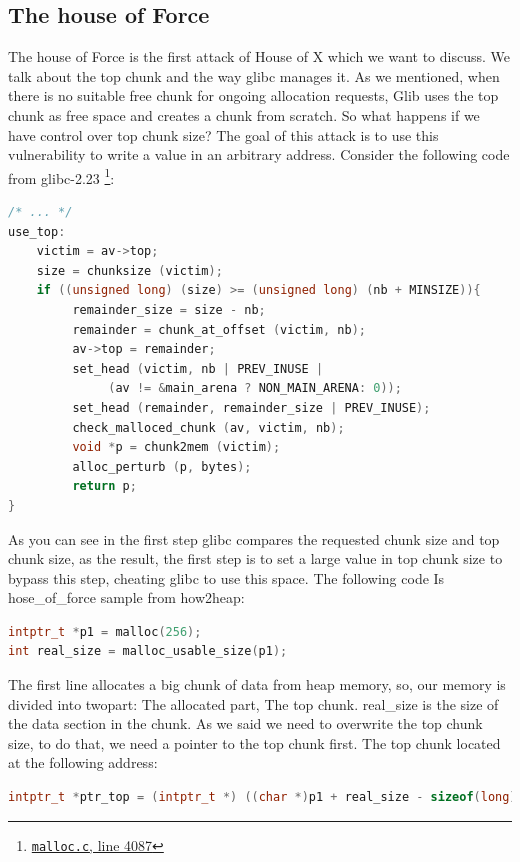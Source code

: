 \documentclass{masterthesis}
\newcommand*\libc{glibc}
\begin{document}
\subsection{The house of Force}
The house of Force is the first attack of House of X which we want to discuss. We talk about the top chunk and the way \libc{} manages it. As we mentioned, when there is no suitable free chunk for ongoing allocation requests, Glib uses the top chunk as free space and creates a chunk from scratch. So what happens if we have control over top chunk size? The goal of this attack is to use this vulnerability to write a value in an arbitrary address. Consider the following code from \libc{-2.23}  \footnote{\href{https://sourceware.org/git/?p=glibc.git;a=blob;f=malloc/malloc.c;h=f7cd29bc2f93e1082ee77800bd64a4b2a2897055;hb=9ea3686266dca3f004ba874745a4087a89682617\#l4087}{\texttt{malloc.c}, line 4087}}:
\begin{lstlisting}[language=c,frame=tlrb]
 /* ... */ 
use_top:
	victim = av->top;
	size = chunksize (victim);
	if ((unsigned long) (size) >= (unsigned long) (nb + MINSIZE)){
	     remainder_size = size - nb;
	     remainder = chunk_at_offset (victim, nb);
	     av->top = remainder;
	     set_head (victim, nb | PREV_INUSE |
	          (av != &main_arena ? NON_MAIN_ARENA: 0));
	     set_head (remainder, remainder_size | PREV_INUSE);
	     check_malloced_chunk (av, victim, nb);
	     void *p = chunk2mem (victim);
	     alloc_perturb (p, bytes);
	     return p;
}
\end{lstlisting}
As you can see in the first step \libc{} compares the requested chunk size and top chunk size, as the result, the first step is to set a large value in top chunk size to bypass this step, cheating \libc{} to use this space. The following code Is hose\_of\_force sample from how2heap:

\begin{lstlisting}[language=c,frame=tlrb]
intptr_t *p1 = malloc(256);
int real_size = malloc_usable_size(p1);
\end{lstlisting}

The first line allocates a big chunk of data from heap memory, so, our memory is divided into two\-part: The allocated part, The top chunk. real\_size is the size of the data section in the chunk. As we said we need to overwrite the top chunk size, to do that, we need a pointer to the top chunk first. The top chunk located at the following address: 

\begin{lstlisting}[language=c,frame=tlrb]
intptr_t *ptr_top = (intptr_t *) ((char *)p1 + real_size - sizeof(long));
\end{lstlisting}
\end{document}
